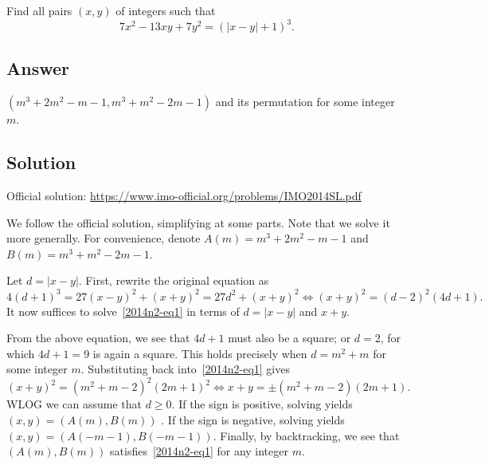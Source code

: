 Find all pairs $(x, y)$ of integers such that
\[ 7x^2 - 13xy + 7y^2 = (|x - y| + 1)^3. \]



\subsection*{Answer}

$(m^3 + 2m^2 - m - 1, m^3 + m^2 - 2m - 1)$ and its permutation for some integer $m$.



\subsection*{Solution}

Official solution: \url{https://www.imo-official.org/problems/IMO2014SL.pdf}

We follow the official solution, simplifying at some parts.
Note that we solve it more generally.
For convenience, denote $A(m) = m^3 + 2m^2 - m - 1$ and $B(m) = m^3 + m^2 - 2m - 1$.

Let $d = |x - y|$.
First, rewrite the original equation as
\[ 4(d + 1)^3 = 27(x - y)^2 + (x + y)^2 = 27d^2 + (x + y)^2 \iff (x + y)^2 = (d - 2)^2 (4d + 1). \tag{1}\label{2014n2-eq1} \]
It now suffices to solve~\eqref{2014n2-eq1} in terms of $d = |x - y|$ and $x + y$.

From the above equation, we see that $4d + 1$ must also be a square; or $d = 2$, for which $4d + 1 = 9$ is again a square.
This holds precisely when $d = m^2 + m$ for some integer $m$.
Substituting back into~\eqref{2014n2-eq1} gives
\[ (x + y)^2 = (m^2 + m - 2)^2 (2m + 1)^2 \iff x + y = \pm (m^2 + m - 2)(2m + 1). \]
WLOG we can assume that $d \geq 0$.
If the sign is positive, solving yields $(x, y) = (A(m), B(m))$ .
If the sign is negative, solving yields $(x, y) = (A(-m - 1), B(-m - 1))$.
Finally, by backtracking, we see that $(A(m), B(m))$ satisfies~\eqref{2014n2-eq1} for any integer $m$.
